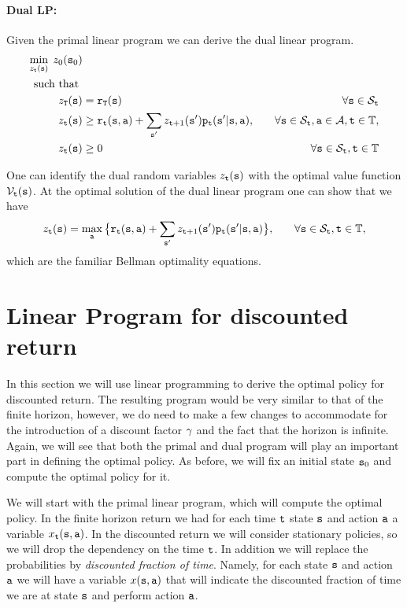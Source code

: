 \paragraph{Dual LP:}
Given the primal linear program we can derive the dual linear
program.
\begin{align*}
\min_{z_{\tt t}({\tt s})}  \;z_0({\tt s}_0)&\\
\mbox{ such that }\\
z_{{\tt T}}({\tt s}) &= {\tt r}_{{\tt T}}({\tt s}) &\quad\forall
{\tt s} \in {\mathcal{S}_{{\tt t}}}\\
 z_{{\tt t}}({\tt s}) &\geq
{\tt r}_{{\tt t}}({\tt s},{\tt a}) + \sum_{{\tt s}'}z_{{\tt t} +
1}({\tt s}'){\tt p}_{{\tt t}}({\tt s}'|{\tt s},{\tt a}) , &\quad\forall {\tt s}
\in {\mathcal{S}_{{\tt t}}},{\tt a}\in\mathcal{A}, {\tt t}\in\mathbb{T},\\ 
 z_{{\tt t}}({\tt s}) &\geq 0 &\quad\forall {\tt s}
\in {\mathcal{S}_{{\tt t}}},{\tt t}\in\mathbb{T}
\end{align*}

One can identify the dual random variables $z_{\tt t}({\tt s})$ with
the optimal value function $\mathcal{V}_{\tt t}({\tt s})$. At the optimal
solution of the dual linear program one can show that we have
\begin{align*}
 z_{{\tt t}}({\tt s}) &= \max_{\tt a} \big\{
{\tt r}_{{\tt t}}({\tt s},{\tt a}) + \sum_{{\tt s}'}z_{{\tt t} +
1}({\tt s}'){\tt p}_{{\tt t}}({\tt s}'|{\tt s},{\tt a}) \big\} , &\quad\forall
{\tt s} \in {\mathcal{S}_{{\tt t}}}, {\tt t}\in\mathbb{T},
\end{align*}
which are the familiar Bellman optimality equations.

\section{Linear Program for discounted return}
\label{chapter-discount:section:LP}

In this section we will use linear programming to derive the optimal
policy for discounted return.
%
The resulting program would be very similar to that of the finite horizon, however, we do need to make a few changes to accommodate for the introduction of a discount factor $\gamma$ and the fact that the horizon is infinite.
%
Again, we will see that both the primal and dual program will play an important part in defining the optimal policy. As before, we will fix an initial state ${\tt s}_0$ and compute the optimal policy for it.

We will start with the primal linear program, which will compute the optimal policy. In the finite horizon return we had for each time ${\tt t}$  state ${\tt s}$ and action ${\tt a}$ a variable $x_{\tt t}({\tt s},{\tt a})$.
In the discounted return we will consider stationary policies, so we will drop the dependency on the time ${\tt t}$. In addition we will replace the probabilities by \textit{discounted fraction of time}.
Namely, for each state ${\tt s}$ and action ${\tt a}$ we will have a variable $x({\tt s},{\tt a})$ that will indicate the discounted fraction of time we are at state ${\tt s}$ and perform action ${\tt a}$.


